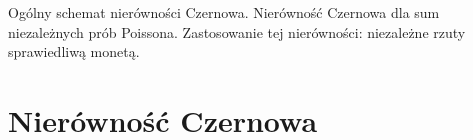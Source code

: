 {
\makeatletter
{}
\makeatother
\graphicspath{{../probabil}}

\begin{questiontext}
	Ogólny schemat nierówności Czernowa. Nierówność Czernowa dla sum niezależnych prób Poissona. Zastosowanie tej nierówności: niezależne rzuty sprawiedliwą monetą.
\end{questiontext}

\section{Nierówność Czernowa}
 {
 }
}